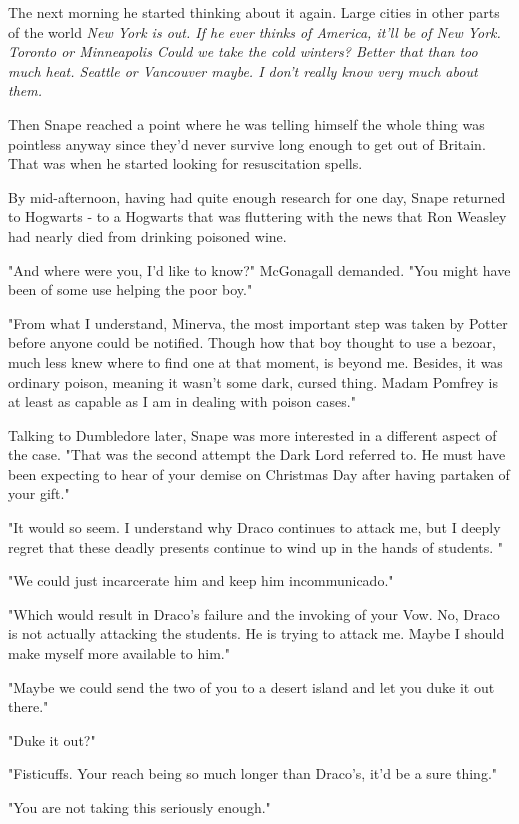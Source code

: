 The next morning he started thinking about it again. Large cities in other parts of the world{\el} \emph{New York is out. If he ever thinks of America, it'll be of New York. Toronto or Minneapolis{\el} Could we take the cold winters? Better that than too much heat. Seattle or Vancouver{\el} maybe. I don't really know very much about them.}

Then Snape reached a point where he was telling himself the whole thing was pointless anyway since they'd never survive long enough to get out of Britain. That was when he started looking for resuscitation spells.

By mid-afternoon, having had quite enough research for one day, Snape returned to Hogwarts - to a Hogwarts that was fluttering with the news that Ron Weasley had nearly died from drinking poisoned wine.

"And where were you, I'd like to know?" McGonagall demanded. "You might have been of some use helping the poor boy."

"From what I understand, Minerva, the most important step was taken by Potter before anyone could be notified. Though how that boy thought to use a bezoar, much less knew where to find one at that moment, is beyond me. Besides, it was ordinary poison, meaning it wasn't some dark, cursed thing. Madam Pomfrey is at least as capable as I am in dealing with poison cases."

Talking to Dumbledore later, Snape was more interested in a different aspect of the case. "That was the second attempt the Dark Lord referred to. He must have been expecting to hear of your demise on Christmas Day after having partaken of your gift."

"It would so seem. I understand why Draco continues to attack me, but I deeply regret that these deadly presents continue to wind up in the hands of students. "

"We could just incarcerate him and keep him incommunicado."

"Which would result in Draco's failure and the invoking of your Vow. No, Draco is not actually attacking the students. He is trying to attack me. Maybe I should make myself more available to him."

"Maybe we could send the two of you to a desert island and let you duke it out there."

"Duke it out?"

"Fisticuffs. Your reach being so much longer than Draco's, it'd be a sure thing."

"You are not taking this seriously enough."

